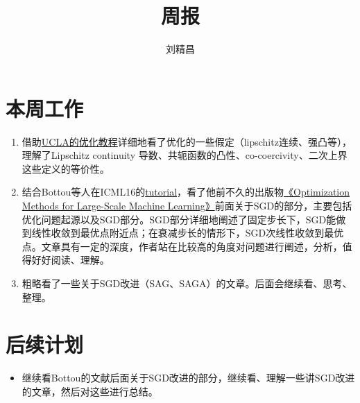 \documentclass{article}
\begin{document}
\title{周报}
\author{刘精昌}
\maketitle

\section*{本周工作}
\begin{enumerate}
  \item 借助\href{http://www.seas.ucla.edu/~vandenbe/ee236c.html}{UCLA的优化教程}详细地看了优化的一些假定（lipschitz连续、强凸等），理解了Lipschitz continuity 导数、共轭函数的凸性、co-coercivity、二次上界这些定义的等价性。
  \item 结合Bottou等人在ICML16的\href{http://users.iems.northwestern.edu/~nocedal/ICML}{tutorial}，看了他前不久的出版物\href{https://arxiv.org/abs/1606.04838}{《Optimization Methods for Large-Scale Machine Learning》}前面关于SGD的部分，主要包括优化问题起源以及SGD部分。SGD部分详细地阐述了固定步长下，SGD能做到线性收敛到最优点附近点；在衰减步长的情形下，SGD次线性收敛到最优点。文章具有一定的深度，作者站在比较高的角度对问题进行阐述，分析，值得好好阅读、理解。
  \item 粗略看了一些关于SGD改进（SAG、SAGA）的文章。后面会继续看、思考、整理。
\end{enumerate}

\section*{后续计划}
\begin{itemize}
    \item 继续看Bottou的文献后面关于SGD改进的部分，继续看、理解一些讲SGD改进的文章，然后对这些进行总结。
\end{itemize}
\end{document}
